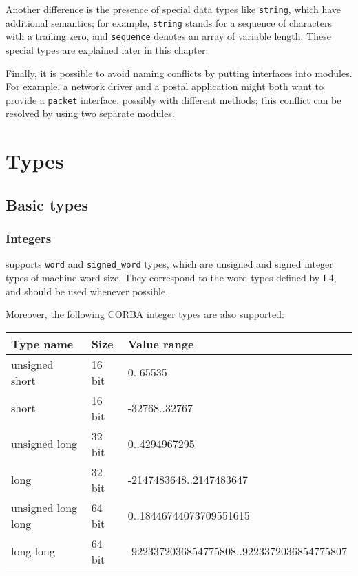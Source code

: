 Another difference is the presence of special data types like 
\texttt{string}, which have additional semantics; for example, \texttt{string}
stands for a sequence of characters with a trailing zero, and 
\texttt{sequence} denotes an array of variable length. These special
types are explained later in this chapter.

Finally, it is possible to avoid naming conflicts by putting interfaces
into modules. For example, a network driver and a postal application
might both want to provide a \texttt{packet} interface, possibly with
different methods; this conflict can be resolved by using two separate
modules.

\section{Types}

\subsection{Basic types}

\subsubsection{Integers}

\IDL supports \texttt{word} and \texttt{signed\_word} types, which
are unsigned and signed integer types of machine word size.
They correspond to the word types defined by L4, and should be
used whenever possible.

Moreover, the following CORBA integer types are also supported:

\begin{center}\begin{tabular}{|l|l|l|}
\hline
Type name	& Size		& Value range			\\\hline
unsigned short 	& 16 bit	& 0..65535			\\
short 		& 16 bit 	& -32768..32767			\\
unsigned long	& 32 bit	& 0..4294967295			\\
long		& 32 bit	& -2147483648..2147483647 	\\	
unsigned long long & 64 bit 	& 0..18446744073709551615	\\
long long	& 64 bit	& -9223372036854775808..9223372036854775807 \\
\hline
\end{tabular}\end{center}

